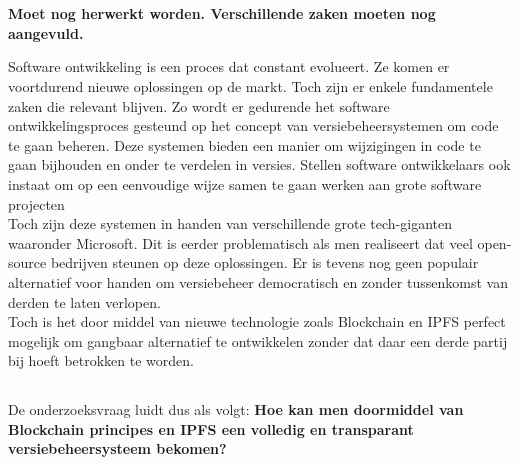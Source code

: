
\chapter{}
\label{ch:inleiding}
\textbf{Moet nog herwerkt worden. Verschillende zaken moeten nog aangevuld.}

Software ontwikkeling is een proces dat constant evolueert. Ze komen er voortdurend nieuwe oplossingen op de markt. Toch zijn er enkele fundamentele zaken die relevant blijven. Zo wordt er gedurende het software ontwikkelingsproces gesteund op het concept van versiebeheersystemen om code te gaan beheren. Deze systemen bieden een manier om wijzigingen in code te gaan bijhouden en onder te verdelen in versies. Stellen software ontwikkelaars ook instaat om op een eenvoudige wijze samen te gaan werken aan grote software projecten\\

Toch zijn deze systemen in handen van verschillende grote tech-giganten waaronder Microsoft. Dit is eerder problematisch als men realiseert dat veel open-source bedrijven steunen op deze oplossingen. Er is tevens nog geen populair alternatief voor handen om versiebeheer democratisch en zonder tussenkomst van derden te laten verlopen.\\

Toch is het door middel van nieuwe technologie zoals Blockchain en IPFS perfect mogelijk om gangbaar alternatief te ontwikkelen zonder dat daar een derde partij bij hoeft betrokken te worden.


\section{}
\label{sec:onderzoeksvraag}
De onderzoeksvraag luidt dus als volgt: \textbf{Hoe kan men doormiddel van Blockchain principes en IPFS een volledig en transparant versiebeheersysteem bekomen?}


\section{}
\label{sec:onderzoeksdoelstelling}

